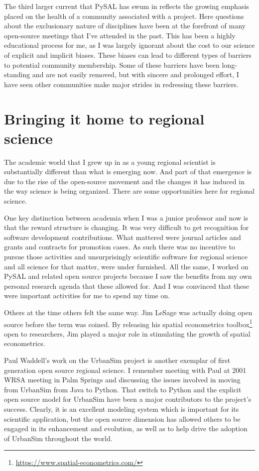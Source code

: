 \documentclass[11pt]{article}
\begin{document}
The third larger current that PySAL has swum in reflects the growing emphasis
placed on the health of a community associated with a project. Here questions
about the exclusionary nature of disciplines have been at the forefront of many open-source meetings that I've attended in the past. This has been a highly
educational process for me, as I was largely ignorant about the cost to our
science of explicit and implicit biases. These biases can lead to different
types of barriers to potential community membership. Some of these barriers
have been long-standing and are not easily removed, but with sincere and
prolonged effort, I have seen other communities make major strides in
redressing these barriers.
\section{Bringing it home to regional science}
\label{sec:org2bffd42}
The academic world that I grew up in as a young regional scientist is
substantially different than what is emerging now. And part of that emergence
is due to the rise of the open-source movement and the changes it has induced in
the way science is being organized. There are some opportunities here for
regional science.

One key distinction between academia when I was a junior professor and now is
that the reward structure is changing. It was very difficult to get recognition
for software development contributions. What mattered were journal articles and
grants and contracts for promotion cases. As such there was no incentive to
pursue those activities and unsurprisingly scientific software for regional
science and all science for that matter, were under furnished. All the same, I
worked on PySAL and related open source projects because I saw the benefits
from my own personal research agenda that these allowed for. And I was
convinced that these were important activities for me to spend my time on.

Others at the time others felt the same way. Jim LeSage was actually doing open
source before the term was coined. By releasing his spatial econometrics
toolbox\footnote{\url{https://www.spatial-econometrics.com/}} open to researchers, Jim played a major role in stimulating the growth
of spatial econometrics.


Paul Waddell's work on the UrbanSim project \citep{waddell_urbansim:_2002} is
another exemplar of first generation open source regional science. I remember
meeting with Paul at 2001 WRSA meeting in Palm Springs and discussing the
issues involved in moving from UrbanSim from Java to Python. That switch to
Python and the explicit open source model for UrbanSim have been a major
contributors to the project's success. Clearly, it is an excellent modeling
system which is important for its scientific application, but the open source
dimension has allowed others to be engaged in its enhancement and evolution, as
well as to help drive the adoption of UrbanSim throughout the world.
\end{document}
